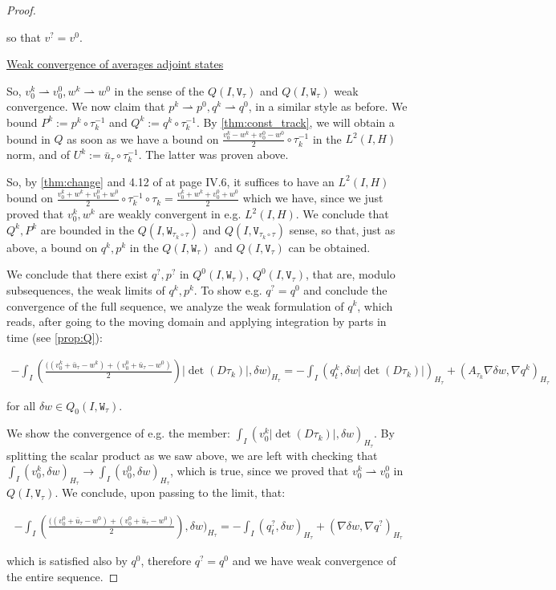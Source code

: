 \documentclass[english,a4paper,9pt,oneside]{scrbook}	%
\theoremstyle{break}
\newenvironment{mproof}[1][\proofname]{%
  \begin{proof}[#1]$ $\par\nobreak\ignorespaces
}{%
  \end{proof}
}
\renewcommand*{\proofname}{Proof}
\theoremstyle{remark}
\newcommand{\ds}{\displaystyle}
\newcommand{\weakc}{\rightharpoonup}
\newcommand{\tw}[1]{\texttt{#1}}
\begin{document}
\begin{mproof}
so that $v^?=v^0$.

\underline{Weak convergence of averages adjoint states}

So, $v_0^k \weakc v_0^0, w^k\weakc w^0$ in the sense of the $Q(I,\tw{V}_\tau)$ and $Q(I,\tw{W}_\tau)$ weak convergence.
We now claim that $p^k \weakc p^0, q^k\weakc q^0$, in a similar style as before. We bound $P^k:=p^k\circ \tau_k^{-1}$ and $Q^k:=q^k\circ \tau_k^{-1}$.
By \cref{thm:const_track}, we will obtain a bound in $Q$  as soon as we have a bound on $\ds \frac{v_0^k-w^k+v_0^0-w^0}{2}\circ \tau_k^{-1}$ in the $L^2(I,H)$ norm, and of $U^k:=\bar{u}_\tau\circ \tau_k^{-1}$. The latter was proven above.

So, by \cref{thm:change} and 4.12 of \cite{murat} at page IV.6, it suffices to have an $L^2(I,H)$ bound on $\ds \frac{v_0^k+w^k+v_0^0+w^0}{2}\circ \tau_k^{-1}\circ \tau_k = \frac{v_0^k+w^k+v_0^0+w^0}{2}$ which we have, since we just proved that $v_0^k, w^k$ are weakly convergent in e.g. $L^2(I,H)$.
We conclude that $Q^k,P^k$ are bounded in the $Q(I,\tw{W}_{\tau_k\circ \tau})$ and $Q(I,\tw{V}_{\tau_k\circ \tau})$ sense, so that, just as above,  a bound on $q^k, p^k$ in the $Q(I,\tw{W}_{ \tau})$ and $Q(I,\tw{V}_{ \tau})$ can be obtained.

We conclude that there exist $q^?, p^?$ in $Q^0(I,\tw{W}_{ \tau})$, $Q^0(I,\tw{V}_{ \tau})$, that are, modulo subsequences, the weak limits of $q^k, p^k$.
To show e.g. $q^?=q^0$ and conclude the convergence of the full sequence, we analyze the weak formulation of $q^k$, which reads, after going to the moving domain and applying integration by parts in time (see \cref{prop:Q}):

\begin{align*}
-\int_I \left (\frac{((v_0^k+\bar{u}_\tau - w^k)+(v_0^0+\bar{u}_\tau - w^0)}{2}\right )|\det(D\tau_k)|,\delta w)_{H_\tau}=
-\int_I (  q^k_t ,   \delta w |\det(D\tau_k)|)_{H_\tau}+ (A_{\tau_k}\nabla \delta w, \nabla q^k)_{H_\tau}
\end{align*}

for all $\delta w \in Q_0(I,\tw{W}_{ \tau})$.

We show the convergence of e.g. the member: $\int_I( v_0^k|\det(D\tau_k)|,\delta w)_{H_\tau}$. By splitting the scalar product as we saw above, we are left with checking that $\int_I (v_0^k,\delta w)_{H_\tau}\rightarrow  \int_I (v_0^0,\delta w)_{H_\tau}$, which is true, since we proved that $v_0^k \weakc v_0^0$ in $Q(I,\tw{V}_\tau)$. We conclude, upon passing to the limit, that:

\begin{align*}
-\int_I \left (\frac{((v_0^0+\bar{u}_\tau - w^0)+(v_0^0+\bar{u}_\tau - w^0)}{2}\right ),\delta w)_{H_\tau} = 
-\int_I (  q^?_t ,   \delta w )_{H_\tau}+ (\nabla \delta w, \nabla q^?)_{H_\tau}
\end{align*}

which is satisfied also by $q^0$, therefore $q^? = q^0$ and we have weak convergence of the entire sequence.
\end{mproof}
\end{document}
